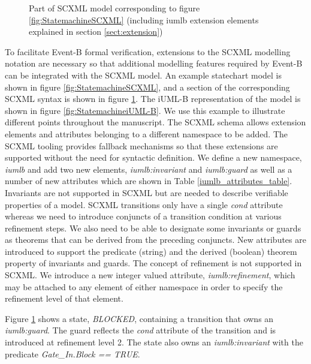 \begin{figure}[tbp!]
  \caption{Part of SCXML model corresponding to figure \ref{fig:StatemachineSCXML} 
   (including iumlb extension elements explained in section \ref{sect:extension}) } 
  \label{fig:scxml}
\end{figure}


To facilitate Event-B formal verification, extensions to the SCXML 
modelling notation are necessary so that additional modelling features 
required by Event-B can be integrated with the SCXML model.
An example statechart model is shown in figure \ref{fig:StatemachineSCXML}, and a section of the corresponding SCXML syntax is shown in figure \ref{fig:scxml}. The iUML-B representation of the model is shown in figure \ref{fig:StatemachineiUML-B}. 
We use this example to illustrate different points throughout the manuscript.
The SCXML schema allows extension elements and attributes belonging 
to a different namespace to be added. 
The SCXML tooling provides fallback mechanisms so that these extensions are supported 
without the need for syntactic definition. We define a new namespace,  
\emph{iumlb} and add two new elements, \emph{iumlb:invariant} and 
\emph{iumlb:guard} as well as a 
number of new attributes which are shown in Table \ref{iumlb_attributes_table}.
Invariants are not supported in SCXML but are needed to describe 
verifiable properties of a model. 
SCXML transitions only have a single \emph{cond} attribute whereas we need to introduce conjuncts of a transition
condition at various refinement steps. 
We also need to be able to designate some 
invariants or guards as theorems that can be derived from the preceding conjuncts. 
New attributes are introduced to support the predicate (string) and the 
derived (boolean) theorem property of invariants and guards. The concept 
of refinement is not supported in SCXML. We introduce a new integer valued 
attribute, \emph{iumlb:refinement}, which may be attached to any element of 
either namespace in order to specify the refinement level of that element. 

Figure \ref{fig:scxml} shows a state, \emph{BLOCKED}, 
containing a transition that owns an \emph{iumlb:guard}.
The guard reflects the \emph{cond} attribute of the transition 
and is introduced at refinement level 2. 
The state also owns an \emph{iumlb:invariant} with the predicate
 \emph{Gate\_In.Block == TRUE}.



